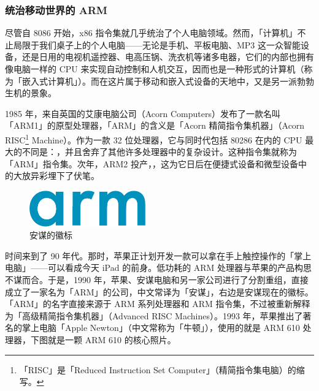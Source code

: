 \subsubsection{统治移动世界的 ARM}

尽管自 8086 开始，x86 指令集就几乎统治了个人电脑领域。然而，「计算机」不止局限于我们桌子上的个人电脑——无论是手机、平板电脑、MP3 这一众智能设备，还是日用的电视机遥控器、电高压锅、洗衣机等诸多电器，它们的内部也拥有像电脑一样的 CPU 来实现自动控制和人机交互，因而也是一种形式的计算机（称为「嵌入式计算机」）。而在这片属于移动和嵌入式设备的天地中，又是另一派勃勃生机的景象。

1985 年，来自英国的艾康电脑公司（Acorn Computers）发布了一款名叫「ARM1」的原型处理器，「ARM」的含义是「Acorn 精简指令集机器」（Acorn RISC\footnote{「RISC」是「Reduced Instruction Set Computer」（精简指令集电脑）的缩写。} Machine）。作为一款 32 位处理器，它与同时代包括 80286 在内的 CPU 最大的不同是：，并且舍弃了其他许多处理器中的复杂设计。这种指令集就称为「ARM」指令集。次年，ARM2 投产，，这为它日后在便捷式设备和微型设备中的大放异彩埋下了伏笔。

\begin{figure}
  \centering
  \vspace*{2ex}
  \includegraphics[width=5cm]{assets/surpass/Arm_logo_2017.pdf}
  \caption{安谋的徽标}
  \label{fig:Arm_logo_2017}
\end{figure}

时间来到了 90 年代。那时，苹果正计划开发一款可以拿在手上触控操作的「掌上电脑」——可以看成今天 iPad 的前身。低功耗的 ARM 处理器与苹果的产品构思不谋而合。于是，1990 年，苹果、安谋电脑和另一家公司进行了分割重组，直接成立了一家名为「ARM」的公司，中文常译为「安谋」，右边是安谋现在的徽标。「ARM」的名字直接来源于 ARM 系列处理器和 ARM 指令集，不过被重新解释为「高级精简指令集机器」（Advanced RISC Machines）。1993 年，苹果推出了著名的掌上电脑「Apple Newton」（中文常称为「牛顿」），使用的就是 ARM 610 处理器，下图就是一颗 ARM 610 的核心照片。

